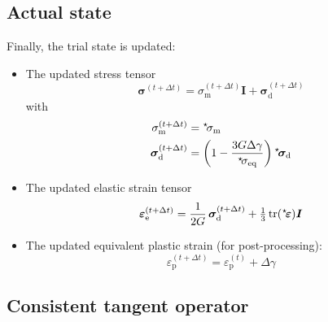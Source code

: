\documentclass[times,namecite]{goose-article}
\newcommand\leftstar[1]{\hspace*{-.3em}~^\star\!#1}
\begin{document}
\subsection{Actual state}

Finally, the trial state is updated:

\begin{itemize}
%
\item The updated stress tensor
\begin{equation}
  \bm{\sigma}^{(t+\Delta t)} = \sigma_\mathrm{m}^{(t+\Delta t)} \bm{I} + \bm{\sigma}_\mathrm{d}^{(t+\Delta t)}
\end{equation}
with
\begin{align}
  \sigma_\mathrm{m}^{(t+\Delta t)}
  &=
  \leftstar{\sigma}_\mathrm{m}
  \\
  \bm{\sigma}_\mathrm{d}^{(t+\Delta t)}
  &=
  \left( 1 - \frac{3 G \Delta \gamma}{\leftstar{\sigma}_\mathrm{eq}} \right)
  \leftstar{\bm{\sigma}}_\mathrm{d}
\end{align}
%
\item The updated elastic strain tensor
\begin{equation}
  \bm{\varepsilon}_\mathrm{e}^{(t+\Delta t)}
  =
  \frac{1}{2G} \, \bm{\sigma}^{(t+\Delta t)}_\mathrm{d} +
  \tfrac{1}{3} \, \mathrm{tr} (\leftstar{\bm{\varepsilon}}) \bm{I}
\end{equation}
%
\item The updated equivalent plastic strain (for post-processing):
\begin{equation}
  \varepsilon_\mathrm{p}^{(t+\Delta t)}
  =
  \varepsilon_\mathrm{p}^{(t)} +
  \Delta \gamma
\end{equation}
%
\end{itemize}

\subsection{Consistent tangent operator}
\end{document}
